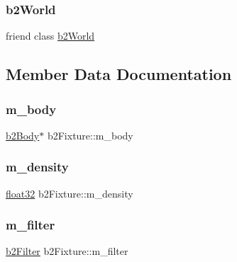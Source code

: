 \subsubsection{\texorpdfstring{b2World}{b2World}}
{\footnotesize\ttfamily friend class \mbox{\hyperlink{classb2_world}{b2\+World}}\hspace{0.3cm}{\ttfamily [friend]}}



\subsection{Member Data Documentation}
\mbox{\label{classb2_fixture_a480026124a6b7e88f2ed89832a08d191}} 
\subsubsection{\texorpdfstring{m\_body}{m\_body}}
{\footnotesize\ttfamily \mbox{\hyperlink{classb2_body}{b2\+Body}}$\ast$ b2\+Fixture\+::m\+\_\+body\hspace{0.3cm}{\ttfamily [protected]}}

\mbox{\label{classb2_fixture_ab8c388182fc7d58d930f6b0aa21d5c60}} 
\subsubsection{\texorpdfstring{m\_density}{m\_density}}
{\footnotesize\ttfamily \mbox{\hyperlink{b2_settings_8h_aacdc525d6f7bddb3ae95d5c311bd06a1}{float32}} b2\+Fixture\+::m\+\_\+density\hspace{0.3cm}{\ttfamily [protected]}}

\mbox{\label{classb2_fixture_a33b66959856506a6d27b32dad0e284c7}} 
\subsubsection{\texorpdfstring{m\_filter}{m\_filter}}
{\footnotesize\ttfamily \mbox{\hyperlink{structb2_filter}{b2\+Filter}} b2\+Fixture\+::m\+\_\+filter\hspace{0.3cm}{\ttfamily [protected]}}

